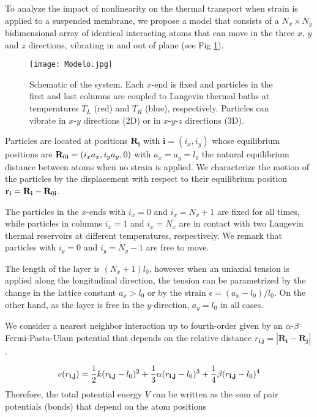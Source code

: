 \documentclass[12pt]{article}
\begin{document}
To analyze the impact of nonlinearity on the thermal transport when strain is applied to a suspended membrane, we propose a model that consists of a $N_{x} \times N_{y}$ bidimensional array of identical interacting atoms that can move in the three $x$, $y$ and $z$ directions, vibrating in and out of plane (see Fig \ref{fig:sketch}). 

\begin{figure}[ht]
 	\begin{center}
		\texttt{[image: Modelo.jpg]}
 	\end{center}  
\caption{Schematic of the system. Each $x$-end is fixed and particles in the first and last columns are coupled to Langevin thermal baths at temperatures $T_L$ (red) and $T_R$ (blue), respectively. Particles can vibrate in $x$-$y$ directions (2D) or in $x$-$y$-$z$ directions (3D).
}
\label{fig:sketch}
\end{figure}

Particles are located at positions $\textbf{R}_\textbf{i}$ with $\textbf{i}=(i_x, i_y)$ whose equilibrium positions are $\textbf{R}_{0 \bf{i}} = (i_x a_x, i_y a_y, 0)$ with $a_x = a_y = l_0$ the natural equilibrium distance between atoms when no strain is applied. We characterize the motion of the particles by the displacement with respect to their equilibrium position $\textbf{r}_{\bf{i}} = \textbf{R}_{\bf{i}}-\textbf{R}_{0 \bf{i}}$.

The particles in the $x$-ends with $i_{x} = 0$ and $i_{x} = N_{x}+1$ are fixed for all times, while particles in columns $i_x = 1$ and $i_x = N_x$ are in contact with two Langevin thermal reservoirs at different temperatures, respectively. We remark that particles with $i_{y} = 0$ and $i_{y} = N_{y}-1$ are free to move.

The length of the layer is $(N_x + 1) l_{0}$, however when an uniaxial tension is applied along the longitudinal direction, the tension can be parametrized by the change in the lattice constant $a_x > l_{0}$ or by the strain $\epsilon = (a_x-l_0)/l_0$. On the other hand, as the layer is free in the $y$-direction,  $a_y = l_0$ in all cases.

We consider a nearest neighbor interaction up to fourth-order given by an $\alpha$-$\beta$ Fermi-Pasta-Ulam potential that depends on the relative distance $r_\textbf{i,j} = |  \mathbf{R}_{\textbf{i}} - \mathbf{R}_{\textbf{j}} | $. 

\begin{equation} \label{PotFPU}
v(r_{\bf{i,j}}) = \frac{1}{2} k (r_{\bf{i,j}} - l_0)^2 + \frac{1}{3} \alpha (r_{\bf{i,j}} - l_0)^3 + \frac{1}{4} \beta (r_{\bf{i,j}} - l_0)^4  
\end{equation} 
Therefore, the total potential energy $V$ can be written as the sum of pair potentials (bonds) that depend on the atom positions
\end{document}
